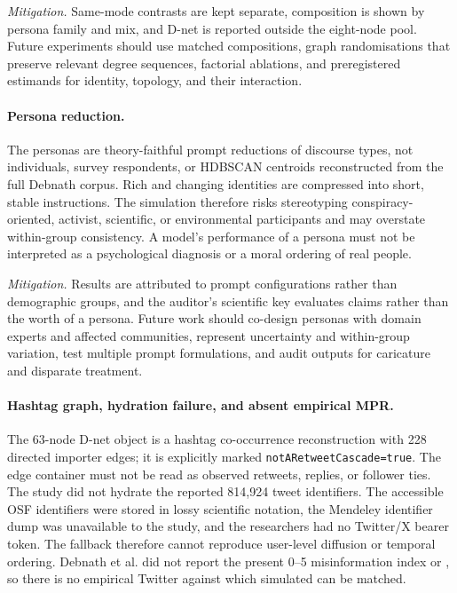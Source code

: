 \emph{Mitigation.}  Same-mode contrasts are kept separate, composition is
shown by persona family and mix, and D-net is reported outside the eight-node
pool.  Future experiments should use matched compositions, graph
randomisations that preserve relevant degree sequences, factorial ablations,
and preregistered estimands for identity, topology, and their interaction.

\paragraph{Persona reduction.}
The personas are theory-faithful prompt reductions of discourse types, not
individuals, survey respondents, or HDBSCAN centroids reconstructed from the
full Debnath corpus.  Rich and changing identities are compressed into short,
stable instructions.  The simulation therefore risks stereotyping
conspiracy-oriented, activist, scientific, or environmental participants and
may overstate within-group consistency.  A model's performance of a persona
must not be interpreted as a psychological diagnosis or a moral ordering of
real people.

\emph{Mitigation.}  Results are attributed to prompt configurations rather
than demographic groups, and the auditor's scientific key evaluates claims
rather than the worth of a persona.  Future work should co-design personas
with domain experts and affected communities, represent uncertainty and
within-group variation, test multiple prompt formulations, and audit outputs
for caricature and disparate treatment.

\paragraph{Hashtag graph, hydration failure, and absent empirical MPR.}
The 63-node D-net object is a hashtag co-occurrence reconstruction with 228
directed importer edges; it is explicitly marked
\texttt{notARetweetCascade=true}.  The edge container must not be read as
observed retweets, replies, or follower ties.  The study did not hydrate the
reported 814,924 tweet identifiers. The accessible OSF identifiers were stored
in lossy scientific notation, the Mendeley identifier dump was unavailable to
the study, and the researchers had no Twitter/X bearer token.  The fallback therefore
cannot reproduce user-level diffusion or temporal ordering.  Debnath et al.
did not report the present 0--5 misinformation index or \MPR{}, so there is no
empirical Twitter \MPR{} against which simulated \MPR{} can be matched.

